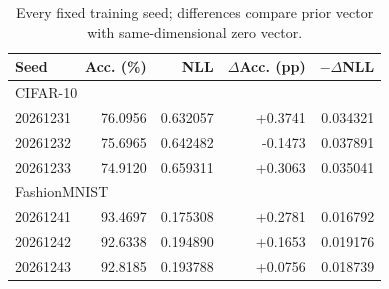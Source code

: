\begin{table}[!ht]
\centering\small
\caption{Every fixed training seed; differences compare prior vector with same-dimensional zero vector.}
\label{tab:seeds}
\begin{tabular}{lrrrr}
\toprule
Seed & Acc. (\%) & NLL & $\Delta$Acc. (pp) & $-\Delta$NLL\\
\midrule
\multicolumn{5}{l}{CIFAR-10}\\
20261231 & 76.0956 & 0.632057 & +0.3741 & 0.034321\\
20261232 & 75.6965 & 0.642482 & -0.1473 & 0.037891\\
20261233 & 74.9120 & 0.659311 & +0.3063 & 0.035041\\
\midrule
\multicolumn{5}{l}{FashionMNIST}\\
20261241 & 93.4697 & 0.175308 & +0.2781 & 0.016792\\
20261242 & 92.6338 & 0.194890 & +0.1653 & 0.019176\\
20261243 & 92.8185 & 0.193788 & +0.0756 & 0.018739\\
\bottomrule
\end{tabular}
\end{table}
